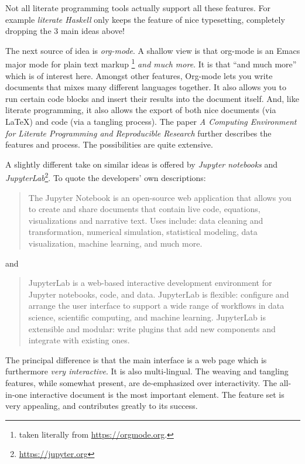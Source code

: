 \documentclass[sigconf,review]{acmart}
\begin{document}
Not all literate programming tools actually support all these features.
For example \emph{literate Haskell} only keeps the feature of nice typesetting,
completely dropping the $3$ main ideas above!

The next source of idea is \emph{org-mode}\cite{org-mode}. A shallow view
is that org-mode is an Emacs major mode for plain text markup%
\footnote{taken literally from \url{https://orgmode.org}.}
\emph{and much more}.  It is that ``and much more'' which is of interest
here. Amongst other features, Org-mode lets you write documents that mixes many
different languages together. It also allows you to run certain code blocks
and insert their results into the document itself. And, like literate
programming, it also allows the export of both nice documents
(via \LaTeX) and code (via a tangling process). The paper
\textit{A Computing Environment for Literate Programming and
Reproducible Research}\cite{SchulteEtAl2012} further describes the features
and process. The possibilities are quite extensive.

A slightly different take on similar ideas is offered by
\emph{Jupyter notebooks} and 
\emph{JupyterLab}\footnote{\url{https://jupyter.org}}. To quote the
developers' own descriptions:

\begin{quote}
The Jupyter Notebook is an open-source web application that allows you to
create and share documents that contain live code, equations, visualizations
and narrative text. Uses include: data cleaning and transformation, numerical
simulation, statistical modeling, data visualization, machine learning, and
much more.
\end{quote}
\noindent and
\begin{quote}
JupyterLab is a web-based interactive development environment for Jupyter
notebooks, code, and data. JupyterLab is flexible: configure and arrange the
user interface to support a wide range of workflows in data science, scientific
computing, and machine learning. JupyterLab is extensible and modular: write
plugins that add new components and integrate with existing ones.
\end{quote}
The principal difference is that the main interface is a web page
which is furthermore \emph{very interactive}. It is also multi-lingual.
The weaving and tangling features, while somewhat present, are de-emphasized
over interactivity. The all-in-one interactive document is the most
important element.  The feature set is very appealing, and contributes greatly
to its success.
\end{document}
